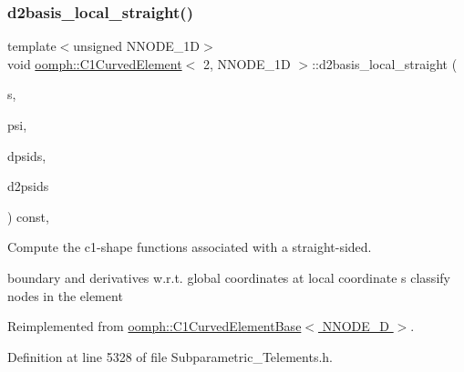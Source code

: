 \subsubsection{\texorpdfstring{d2basis\+\_\+local\+\_\+straight()}{d2basis\_local\_straight()}}
{\footnotesize\ttfamily template$<$unsigned N\+N\+O\+D\+E\+\_\+1D$>$ \\
void \hyperlink{classoomph_1_1C1CurvedElement}{oomph\+::\+C1\+Curved\+Element}$<$ 2, N\+N\+O\+D\+E\+\_\+1D $>$\+::d2basis\+\_\+local\+\_\+straight (\begin{DoxyParamCaption}\item[{const \hyperlink{classoomph_1_1Vector}{Vector}$<$ double $>$ \&}]{s,  }\item[{\hyperlink{classoomph_1_1Shape}{Shape} \&}]{psi,  }\item[{\hyperlink{classoomph_1_1DShape}{D\+Shape} \&}]{dpsids,  }\item[{\hyperlink{classoomph_1_1DShape}{D\+Shape} \&}]{d2psids }\end{DoxyParamCaption}) const\hspace{0.3cm}{\ttfamily [inline]}, {\ttfamily [virtual]}}



Compute the c1-\/shape functions associated with a straight-\/sided. 

boundary and derivatives w.\+r.\+t. global coordinates at local coordinate s classify nodes in the element 

Reimplemented from \hyperlink{classoomph_1_1C1CurvedElementBase_a5d919ef0eef6ae6477642b3dcd1196df}{oomph\+::\+C1\+Curved\+Element\+Base$<$ N\+N\+O\+D\+E\+\_\+D $>$}.



Definition at line 5328 of file Subparametric\+\_\+\+Telements.\+h.

\mbox{\label{classoomph_1_1C1CurvedElement_3_012_00_01NNODE__1D_01_4_a075b64b7a480cf9839ae308764c5f355}} 
